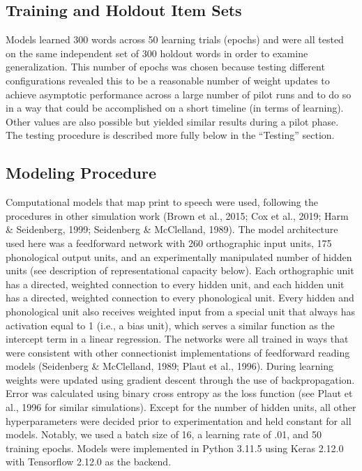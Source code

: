 \documentclass[
  ,man,floatsintext]{apa6}
\begin{document}
\subsection{Training and Holdout Item Sets}\label{training-and-holdout-item-sets}

Models learned 300 words across 50 learning trials (epochs) and were all tested on the same independent set of 300 holdout words in order to examine generalization. This number of epochs was chosen because testing different configurations revealed this to be a reasonable number of weight updates to achieve asymptotic performance across a large number of pilot runs and to do so in a way that could be accomplished on a short timeline (in terms of learning). Other values are also possible but yielded similar results during a pilot phase. The testing procedure is described more fully below in the ``Testing'' section.

\subsection{Modeling Procedure}\label{modeling-procedure}

Computational models that map print to speech were used, following the procedures in other simulation work (Brown et al., 2015; Cox et al., 2019; Harm \& Seidenberg, 1999; Seidenberg \& McClelland, 1989). The model architecture used here was a feedforward network with 260 orthographic input units, 175 phonological output units, and an experimentally manipulated number of hidden units (see description of representational capacity below). Each orthographic unit has a directed, weighted connection to every hidden unit, and each hidden unit has a directed, weighted connection to every phonological unit. Every hidden and phonological unit also receives weighted input from a special unit that always has activation equal to 1 (i.e., a bias unit), which serves a similar function as the intercept term in a linear regression. The networks were all trained in ways that were consistent with other connectionist implementations of feedforward reading models (Seidenberg \& McClelland, 1989; Plaut et al., 1996). During learning weights were updated using gradient descent through the use of backpropagation. Error was calculated using binary cross entropy as the loss function (see Plaut et al., 1996 for similar simulations). Except for the number of hidden units, all other hyperparameters were decided prior to experimentation and held constant for all models. Notably, we used a batch size of 16, a learning rate of .01, and 50 training epochs. Models were implemented in Python 3.11.5 using Keras 2.12.0 with Tensorflow 2.12.0 as the backend.
\end{document}

